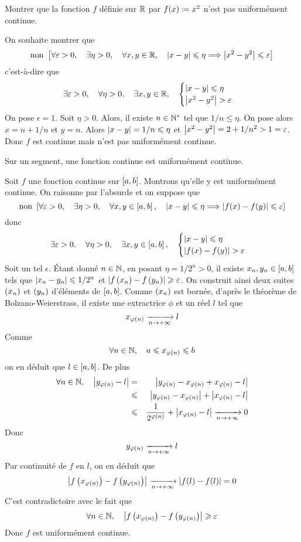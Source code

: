 \documentclass{magnolia}
\begin{document}
\begin{exoUnique}
\exo Montrer que la fonction $f$ définie sur $\mathbb{R}$ par $f(x)\coloneqq x^2$
  n'est pas uniformément continue.
  \begin{sol}
  On souhaite montrer que
  \[{\rm non}\ \left[\forall \varepsilon>0 ,\quad \exists \eta>0 ,\quad
           \forall x,y\in\mathbb{R},\quad
           \left|x-y\right|\leqslant\eta \Longrightarrow \left|x^2-y^2\right|\leqslant\varepsilon\right]\]
  c'est-à-dire que
  \[\exists \epsilon>0 \qsep \forall \eta>0 \qsep \exists x,y\in\R
    \qsep
    \begin{cases}
    \abs{x-y}\leq\eta \\
    \abs{x^2-y^2}>\epsilon
    \end{cases}\]
  On pose $\epsilon=1$. Soit $\eta>0$. Alors, il existe $n\in{\mathbb{N}^*}$ tel que
  $1/n\leq\eta$. On pose alors $x=n+1/n$ et $y=n$. Alors $\left|x-y\right|=1/n\leqslant\eta$
  et $\left|x^2-y^2\right|=2+1/n^2>1=\varepsilon$. Donc $f$ est continue mais n'est pas
  uniformément continue.      
  \end{sol}
\end{exoUnique}

\begin{theoreme}[nom=Théorème de \nom{Heine}]
Sur un segment, une fonction continue est uniformément continue.
\end{theoreme}

\begin{preuve}
Soit $f$ une fonction continue sur $\left[a,b\right]$. Montrons qu'elle y est
uniformément continue. On raisonne par l'absurde et on suppose que
\[{\rm non}\ \left[\forall \varepsilon>0 ,\quad \exists \eta>0 ,\quad
           \forall x,y\in\left[a,b\right],\quad
           \left|x-y\right|\leqslant\eta \Longrightarrow \left|f(x)-f(y)\right|\leqslant\varepsilon\right]\]
donc
\[\exists \epsilon>0 \qsep \forall \eta>0 \qsep \exists x,y\in\interf{a}{b}
  \qsep
  \begin{cases}
  \abs{x-y}\leq\eta \\
  \abs{f(x)-f(y)}>\epsilon
  \end{cases}\]
Soit un tel $\epsilon$. Étant donné $n\in\mathbb{N}$, en posant $\eta=1/2^n>0$, il
existe $x_n,y_n\in\left[a,b\right]$ tels que $\left|x_n-y_n\right|\leqslant 1/2^n$
et $\left|f\left(x_n\right)-f\left(y_n\right)\right|\geqslant \varepsilon$. On construit ainsi deux suites
$\left(x_n\right)$ et $\left(y_n\right)$ d'éléments de $\left[a,b\right]$. Comme $\left(x_n\right)$ est
bornée, d'après le théorème de Bolzano-Weierstrass, il existe une extractrice
$\phi$ et un réel $l$ tel que
\[x_{\varphi(n)}\xrightarrow[n\rightarrow +\infty]{} l\]
Comme
\[\forall n\in\mathbb{N} ,\quad a\leqslant x_{\varphi(n)}\leqslant b\]
on en déduit que $l\in\left[a,b\right]$. De plus
\begin{eqnarray*}
\forall n\in\mathbb{N} ,\quad \left|y_{\varphi(n)}-l\right|
&=& \left|y_{\varphi(n)}-x_{\varphi(n)}+x_{\varphi(n)}-l\right|\\
&\leqslant& \left|y_{\varphi(n)}-x_{\varphi(n)}\right|+\left|x_{\varphi(n)}-l\right|\\
&\leqslant& \frac{1}{2^{\varphi(n)}}+\left|x_{\varphi(n)}-l\right|\xrightarrow[n\rightarrow +\infty]{} 0
\end{eqnarray*}
Donc 
\[y_{\varphi(n)}\xrightarrow[n\rightarrow +\infty]{} l\]
Par continuité de $f$ en $l$, on en déduit que
\[\left|f\left(x_{\varphi(n)}\right)-f\left(y_{\varphi(n)}\right)\right|\xrightarrow[n\rightarrow +\infty]{}
  \left|f(l)-f(l)\right|=0\]
C'est contradictoire avec le fait que
\[\forall n\in\mathbb{N} ,\quad \left|f\left(x_{\varphi(n)}\right)-f\left(y_{\varphi(n)}\right)\right|\geqslant \varepsilon\]
Donc $f$ est uniformément continue.
\end{preuve}
\end{document}
